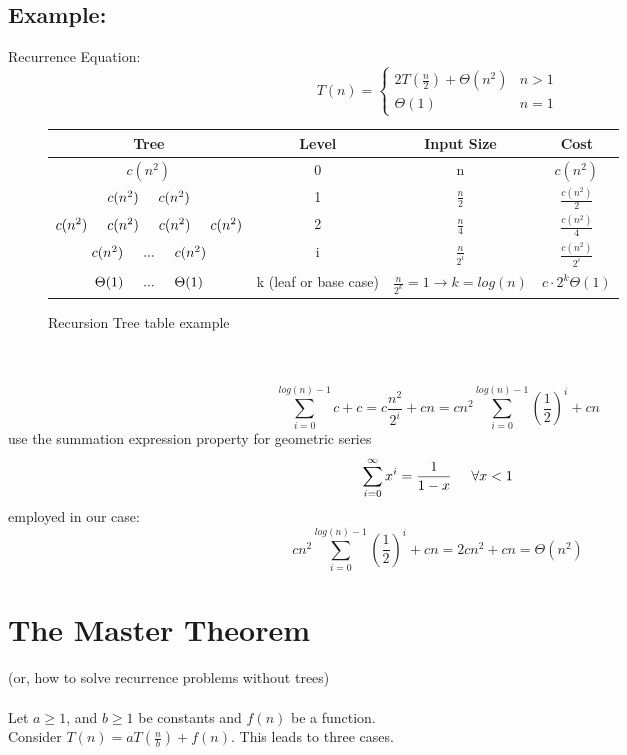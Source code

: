 \documentclass[12pt,letterpaper]{article}
\begin{document}
\subsection{Example:}
Recurrence Equation:
\[T(n)=\begin{cases}2T(\frac{n}{2})+\Theta(n^2) & n>1\\ \Theta(1) & n=1\end{cases}\]
\begin{figure}[h]
\centering
\begin{tabular}{|c|c|c|c|}
\hline
Tree & Level & Input Size & Cost\\
\hline
\hline
$c(n^2)$ & 0 & n & $c(n^2)$\\
\hline
$c(n^2)\hspace{.5cm}c(n^2)$ & 1 & $\frac{n}{2}$ & $\frac{c(n^2)}{2}$\\
\hline
$ c(n^2) \hspace{.5cm} c(n^2) \hspace{.5cm} c(n^2)\hspace{.5cm}c(n^2)$ & 2 & $\frac{n}{4}$ &  $\frac{c(n^2)}{4}$\\
\hline
$c(n^2)\hspace{.5cm}...\hspace{.5cm}c(n^2)$ & i & $\frac{n}{2^i}$ & $\frac{c(n^2)}{2^i}$\\
\hline
$\Theta(1)\hspace{.5cm}...\hspace{.5cm}\Theta(1)$ & k (leaf or base case) & $\frac{n}{2^k}=1 \to k=log(n)$ & $c\cdot 2^k\Theta(1)$\\
\hline
\end{tabular}
\caption{Recursion Tree table example}
\end{figure}\\ \\
\[\sum_{i=0}^{log(n)-1}c+c=c\frac{n^2}{2^i}+cn = cn^2\sum_{i=0}^{log(n)-1}(\frac{1}{2})^i+cn\]
use the summation expression property for geometric series
\[ \sum_{i=0}^{\infty} x^i=\frac{1}{1-x}\hspace{.5cm} \forall x<1\]
employed in our case:
\[cn^2\sum_{i=0}^{log(n)-1}(\frac{1}{2})^i+cn=2cn^2+cn=\Theta(n^2)\]

\section{The Master Theorem}
(or, how to solve recurrence problems without trees)\\ \\
Let $a\ge1$, and $b\ge1$ be constants and $f(n)$ be a function.\\ Consider $T(n)=aT(\frac{n}{b})+f(n)$. This leads to three cases.
\end{document}
